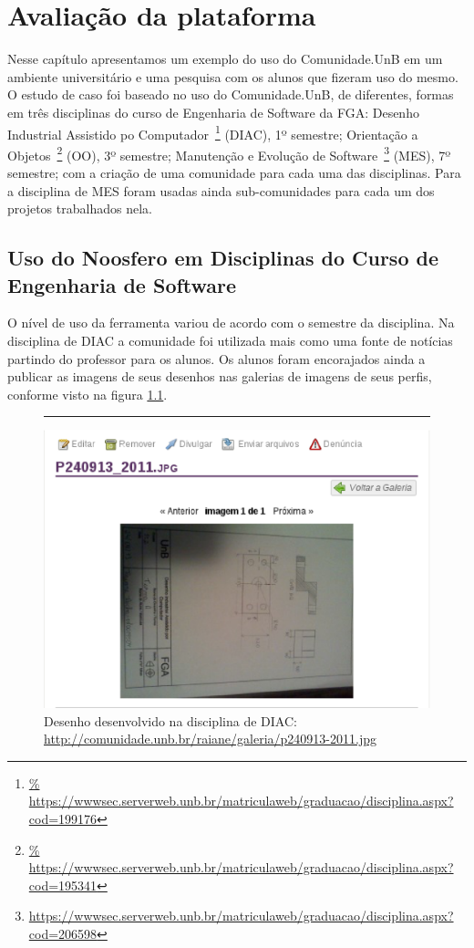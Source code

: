 \chapter{Avaliação da plataforma}

Nesse capítulo apresentamos um exemplo do uso do Comunidade.UnB em um ambiente
universitário e uma pesquisa com os alunos que fizeram uso do mesmo.
%
O estudo de caso foi baseado no uso do Comunidade.UnB, de diferentes, formas em
três disciplinas do curso de Engenharia de Software da FGA:
%
Desenho Industrial Assistido po Computador~\footnote{\url{%
https://wwwsec.serverweb.unb.br/matriculaweb/graduacao/disciplina.aspx?cod=199176}} (DIAC), 1º semestre;
%
Orientação a Objetos~\footnote{\url{%
https://wwwsec.serverweb.unb.br/matriculaweb/graduacao/disciplina.aspx?cod=195341}}
(OO), 3º semestre;
%
Manutenção e Evolução de Software~\footnote{\url{
https://wwwsec.serverweb.unb.br/matriculaweb/graduacao/disciplina.aspx?cod=206598}}
(MES), 7º semestre; 
%
com a criação de uma comunidade para cada uma das disciplinas. Para a disciplina de
MES foram usadas ainda sub-comunidades para cada um dos projetos trabalhados nela.

\section{Uso do Noosfero em Disciplinas do Curso de Engenharia de Software}
\label{mes-unb}

O nível de uso da ferramenta variou de acordo com o semestre da disciplina. Na
disciplina de DIAC a comunidade foi utilizada mais como uma fonte de notícias
partindo do professor para os alunos. Os alunos foram encorajados ainda a publicar
as imagens de seus desenhos nas galerias de imagens de seus perfis, conforme
visto na figura \ref{imagem-diac}.

\begin{figure}[h!]
    \centering
		\rule{1cm}{1cm}
    \includegraphics[keepaspectratio=true,scale=0.65]
      {figuras/imagem-diac.eps}
    \caption{Desenho desenvolvido na disciplina de DIAC:\newline
\url{http://comunidade.unb.br/raiane/galeria/p240913-2011.jpg}}
    \label{imagem-diac}
\end{figure}

